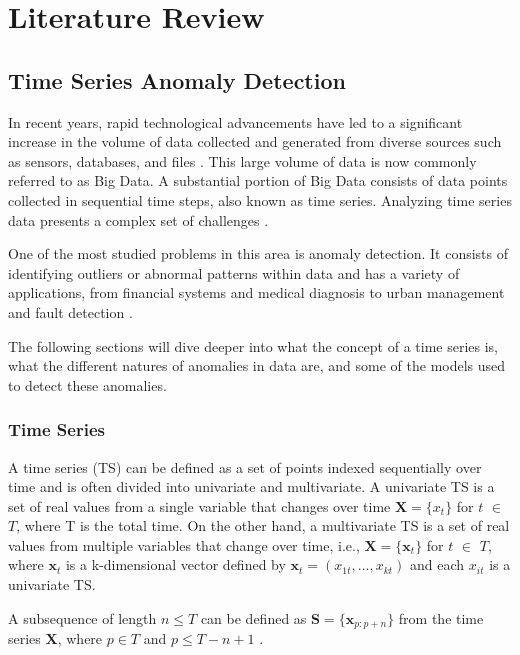 \chapter{Literature Review}\label{sec2_revisao_lit}
\section{Time Series Anomaly Detection}

In recent years, rapid technological advancements have led to a significant increase in the volume of data collected and generated from diverse sources such as sensors, databases, and files \cite{attoh2017big}. This large volume of data is now commonly referred to as Big Data. A substantial portion of Big Data consists of data points collected in sequential time steps, also known as time series. Analyzing time series data presents a complex set of challenges \cite{Tsai_Lai_Chao_Vasilakos_2015}. 

One of the most studied problems in this area is anomaly detection. It consists of identifying outliers or abnormal patterns within data and has a variety of applications, from financial systems and medical diagnosis to urban management and fault detection \cite{Blazquez-Garcia_Conde_Mori_Lozano_2021,Zamanzadeh_Darban_Webb_Pan_Aggarwal_Salehi_2024,Samariya_Thakkar_2021}. 

The following sections will dive deeper into what the concept of a time series is, what  the different natures of anomalies in data are, and some of the models used to detect these anomalies.

\subsection{Time Series}

A time series (TS) can be defined as a set of points indexed sequentially over time and is often divided into univariate and multivariate. A univariate TS is a set of real values from a single variable that changes over time $\textbf{X} = \{x_t\}$ for $t$ $\in$ $T$, where T is the total time. On the other hand, a multivariate TS is a set of real values from multiple variables that change over time, i.e., $\textbf{X} = \{\textbf{x}_t\}$ for $t$ $\in$ $T$, where $\textbf{x}_t$ is a k-dimensional vector defined by $\textbf{x}_t = (x_{1t}, ..., x_{kt})$ and each $x_{it}$ is a univariate TS. 

A subsequence of length $n \leq T$ can be defined as $\textbf{S} = \{\textbf{x}_{p:p+n}\}$ from the time series $\textbf{X}$, where $p \in T$ and $p \leq T-n+1$ \cite{Zamanzadeh_Darban_Webb_Pan_Aggarwal_Salehi_2024, Blazquez-Garcia_Conde_Mori_Lozano_2021}. 

